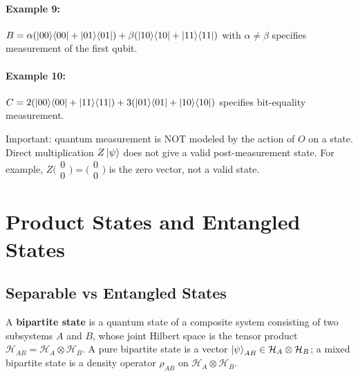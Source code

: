 \documentclass[10pt,a4paper]{article}
\begin{document}
\paragraph{Example 9:} $B=\alpha(\ket{00}\!\bra{00}+\ket{01}\!\bra{01})+\beta(\ket{10}\!\bra{10}+\ket{11}\!\bra{11})$ with $\alpha\neq\beta$ specifies measurement of the first qubit.

\paragraph{Example 10:} $C=2(\ket{00}\!\bra{00}+\ket{11}\!\bra{11})+3(\ket{01}\!\bra{01}+\ket{10}\!\bra{10})$ specifies bit-equality measurement.

Important: quantum measurement is NOT modeled by the action of $O$ on a state. Direct multiplication $Z\ket{\psi}$ does not give a valid post-measurement state. For example, $Z\bigl(\begin{smallmatrix}0\\0\end{smallmatrix}\bigr)=\bigl(\begin{smallmatrix}0\\0\end{smallmatrix}\bigr)$ is the zero vector, not a valid state.

\section{Product States and Entangled States}

\subsection{Separable vs Entangled States}

\begin{tcolorbox}[defstyle, title={Definition: Bipartite State}]
A \textbf{bipartite state} is a quantum state of a composite system consisting of two subsystems $A$ and $B$, whose joint Hilbert space is the tensor product $\mathcal{H}_{AB}=\mathcal{H}_A\otimes\mathcal{H}_B$. A pure bipartite state is a vector $\ket{\psi}_{AB}\in\mathcal{H}_A\otimes\mathcal{H}_B$; a mixed bipartite state is a density operator $\rho_{AB}$ on $\mathcal{H}_A\otimes\mathcal{H}_B$.
\end{tcolorbox}
\end{document}
